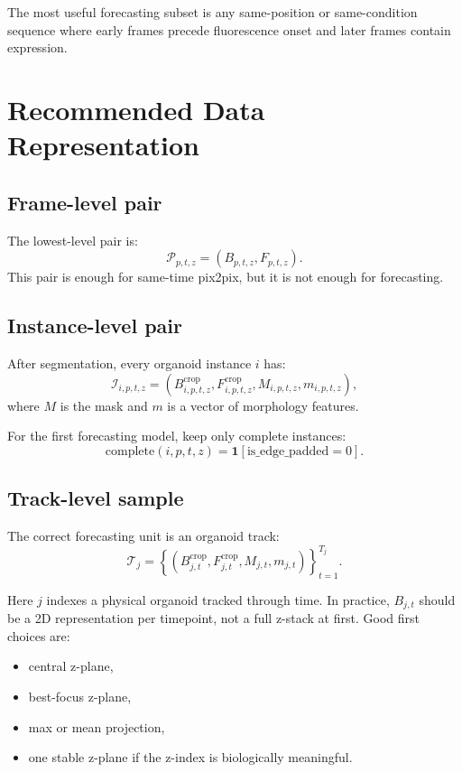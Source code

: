 \documentclass[11pt]{article}
\newcommand{\1}{\mathbf{1}}
\begin{document}
The most useful forecasting subset is any same-position or same-condition sequence where early frames precede fluorescence onset and later frames contain expression.

\section{Recommended Data Representation}
\subsection{Frame-level pair}
The lowest-level pair is:
\begin{equation}
\mathcal{P}_{p,t,z} = (B_{p,t,z},F_{p,t,z}).
\end{equation}
This pair is enough for same-time pix2pix, but it is not enough for forecasting.

\subsection{Instance-level pair}
After segmentation, every organoid instance \(i\) has:
\begin{equation}
\mathcal{I}_{i,p,t,z} =
\left(B_{i,p,t,z}^{\mathrm{crop}},
F_{i,p,t,z}^{\mathrm{crop}},
M_{i,p,t,z},
m_{i,p,t,z}\right),
\end{equation}
where \(M\) is the mask and \(m\) is a vector of morphology features.

For the first forecasting model, keep only complete instances:
\begin{equation}
\mathrm{complete}(i,p,t,z) = \1[\mathrm{is\_edge\_padded}=0].
\end{equation}

\subsection{Track-level sample}
The correct forecasting unit is an organoid track:
\begin{equation}
\mathcal{T}_j =
\left\{
\left(B_{j,t}^{\mathrm{crop}},F_{j,t}^{\mathrm{crop}},M_{j,t},m_{j,t}\right)
\right\}_{t=1}^{T_j}.
\end{equation}

Here \(j\) indexes a physical organoid tracked through time. In practice, \(B_{j,t}\) should be a 2D representation per timepoint, not a full z-stack at first. Good first choices are:
\begin{itemize}[leftmargin=1.5em]
  \item central z-plane,
  \item best-focus z-plane,
  \item max or mean projection,
  \item one stable z-plane if the z-index is biologically meaningful.
\end{itemize}
\end{document}
